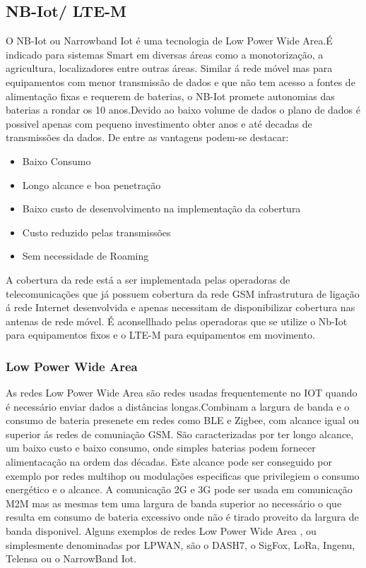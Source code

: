 \subsection {NB-Iot/ LTE-M}
O NB-Iot ou Narrowband Iot é uma tecnologia de Low Power Wide Area.É indicado para sistemas Smart em diversas áreas como a monotorização, a agricultura, localizadores entre outras áreas. Similar á rede móvel mas para equipamentos com menor transmissão de dados e que não tem acesso a fontes de alimentação fixas e requerem de baterias, o NB-Iot promete autonomias das baterias a rondar os 10 anos\cite{u_2017}.Devido ao baixo volume de dados o plano de dados é possivel apenas com pequeno investimento obter anos e até decadas de transmissões da dados. De entre as vantagens podem-se destacar:
\begin{itemize}
\item Baixo Consumo
\item Longo alcance e boa penetração
\item Baixo custo de desenvolvimento na implementação da cobertura
\item Custo reduzido pelas transmissões
\item Sem necessidade de Roaming
\end{itemize}
\par
A cobertura da rede está a ser implementada pelas operadoras de telecomunicações que já possuem cobertura da rede GSM infrastrutura de ligação á rede Internet desenvolvida e apenas necessitam de 
disponibilizar cobertura nas antenas de rede móvel. É aconsellhado pelas operadoras que se utilize o Nb-Iot para equipamentos fixos e o LTE-M para equipamentos em movimento.

\subsubsection { Low Power Wide Area}
As redes Low Power Wide Area são redes usadas frequentemente no IOT quando é necessário enviar dados a distâncias longas.Combinam a largura de banda e o consumo de bateria presenete em redes como BLE e Zigbee, com alcance igual ou superior ás redes de comuniação GSM. São caracterizadas por ter longo alcance, um baixo custo e baixo consumo, onde simples baterias podem fornecer alimentacação na ordem das décadas. Este alcance pode ser conseguido por exemplo por redes multihop ou modulações especificas que privilegiem o consumo energético e o alcance. A comunicação 2G e 3G pode ser usada em comunicação M2M mas as mesmas tem uma largura de banda superior ao necessário o que resulta em consumo de bateria excessivo onde não é tirado proveito da largura de banda disponivel. Alguns exemplos de redes  Low Power Wide Area , ou simplesmente denominadas por LPWAN, são o DASH7, o SigFox, LoRa,  Ingenu, Telensa ou o NarrowBand Iot.\cite{lpwanoverview}

